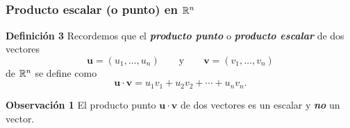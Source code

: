 
\subsection{}

\begin{frame}\frametitle{Producto escalar (o punto) en $\mathbb{R}^n$}
	
	\begin{defi}{\textbf{Definición 3}}\justifying
		Recordemos que el \textbf{\textit{producto punto}} o \textbf{\textit{producto escalar}} de dos vectores
		\[
		\mathbf{u}=(u_1,\hdots,u_n) \qquad \text{y} \qquad \mathbf{v}=(v_1,\hdots,v_n)
		\]
		de $\mathbb{R}^n$ se define como
		\[
		\mathbf{u} \cdot \mathbf{v} = u_1 v_1 + u_2 v_2 +  \cdots + u_n v_n.
		\]
	\end{defi}	
	
	\vspace{0mm}
	
	\begin{alertblock}{\textbf{Observación 1}}
		El producto punto $\mathbf{u} \cdot \mathbf{v}$ de dos vectores es un escalar y \textbf{\textit{no}} un vector.
	\end{alertblock}
	
	
\end{frame}



\subsection{}

